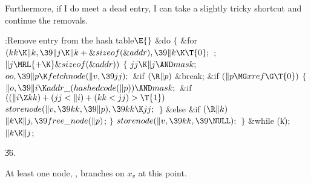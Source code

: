 Furthermore, if I do meet a dead entry, I can take a slightly tricky
shortcut and continue the removals.

\Y\B\4:Remove entry  from the hash table\X${}\E{}$\6
\&{do}\5
${}\{{}$\1\6
\&{for} ${}(\\{kk}\K\|k,\39\|j\K\|k+\&{sizeof}(\&{addr}),\39\|k\K\T{0};{}$  ;
${}\|j\MRL{+{\K}}\&{sizeof}(\&{addr})){}$\5
${}\{{}$\1\6
${}\\{jj}\K\|j\AND\\{mask};{}$\6
${}\\{oo},\39\|p\K\\{fetchnode}(\|v,\39\\{jj});{}$\6
\&{if} ${}(\R\|p){}$\1\5
\&{break};\2\6
\&{if} ${}(\|p\MG\\{xref}\G\T{0}){}$\5
${}\{{}$\1\6
${}\|o,\39\|i\K\\{addr\_}(\\{hashedcode}(\|p))\AND\\{mask};{}$\6
\&{if} ${}((\|i\Z\\{kk})+(\\{jj}<\|i)+(\\{kk}<\\{jj})>\T{1}){}$\1\5
${}\\{storenode}(\|v,\39\\{kk},\39\|p),\39\\{kk}\K\\{jj};{}$\2\6
\4${}\}{}$\5
\2\&{else} \&{if} ${}(\R\|k){}$\1\5
${}\|k\K\|j,\39\\{free\_node}(\|p){}$;\2\6
\4${}\}{}$\2\6
${}\\{storenode}(\|v,\39\\{kk},\39\NULL);{}$\6
\4${}\}{}$\2\5
\&{while} (\|k);\6
${}\|k\K\|j{}$;\par
\U36.\fi

At least one node, , branches on $x_v$ at this point.

